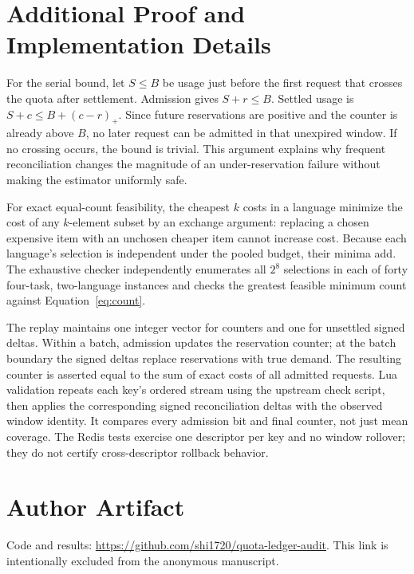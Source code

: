 \documentclass[manuscript,screen]{acmart}
\begin{document}
\section{Additional Proof and Implementation Details}
For the serial bound, let $S\leq B$ be usage just before the first request that crosses the quota after settlement. Admission gives $S+r\leq B$. Settled usage is $S+c\leq B+(c-r)_+$. Since future reservations are positive and the counter is already above $B$, no later request can be admitted in that unexpired window. If no crossing occurs, the bound is trivial. This argument explains why frequent reconciliation changes the magnitude of an under-reservation failure without making the estimator uniformly safe.

For exact equal-count feasibility, the cheapest $k$ costs in a language minimize the cost of any $k$-element subset by an exchange argument: replacing a chosen expensive item with an unchosen cheaper item cannot increase cost. Because each language's selection is independent under the pooled budget, their minima add. The exhaustive checker independently enumerates all $2^8$ selections in each of forty four-task, two-language instances and checks the greatest feasible minimum count against Equation~\eqref{eq:count}.

The replay maintains one integer vector for counters and one for unsettled signed deltas. Within a batch, admission updates the reservation counter; at the batch boundary the signed deltas replace reservations with true demand. The resulting counter is asserted equal to the sum of exact costs of all admitted requests. Lua validation repeats each key's ordered stream using the upstream check script, then applies the corresponding signed reconciliation deltas with the observed window identity. It compares every admission bit and final counter, not just mean coverage. The Redis tests exercise one descriptor per key and no window rollover; they do not certify cross-descriptor rollback behavior.

\ifdefined\namedversion
\section{Author Artifact}
Code and results: \url{https://github.com/shi1720/quota-ledger-audit}. This link is intentionally excluded from the anonymous manuscript.
\fi
\end{document}
